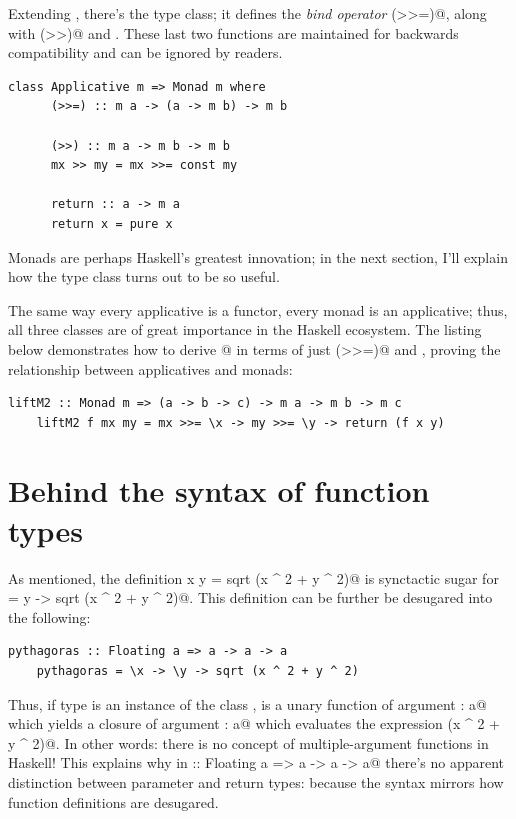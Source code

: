 \documentclass[UdineBachThesis,american,11pt,draft]{PhdThesis}
\begin{document}
  Extending \lstinline@Applicative@, there's the \lstinline@Monad@ type class;
  it defines the \emph{bind operator} \lstinline@(>>=)@, along with
  \lstinline@(>>)@ and \lstinline@return@. These last two functions are
  maintained for backwards compatibility and can be ignored by readers.

  \begin{lstlisting}[gobble=4,basicstyle=\ttfamily\small]
    class Applicative m => Monad m where
      (>>=) :: m a -> (a -> m b) -> m b

      (>>) :: m a -> m b -> m b
      mx >> my = mx >>= const my

      return :: a -> m a
      return x = pure x
  \end{lstlisting}

  Monads are perhaps Haskell's greatest innovation; in the next section, I'll
  explain how the \lstinline@Monad@ type class turns out to be so useful.

  The same way every applicative is a functor, every monad is an applicative;
  thus, all three classes are of great importance in the Haskell ecosystem. The
  listing below demonstrates how to derive @ in terms of just
  \lstinline@(>>=)@ and \lstinline@return@, proving the relationship between
  applicatives and monads:

  \begin{lstlisting}[gobble=4,basicstyle=\ttfamily\small]
    liftM2 :: Monad m => (a -> b -> c) -> m a -> m b -> m c
    liftM2 f mx my = mx >>= \x -> my >>= \y -> return (f x y)
  \end{lstlisting}

  \section{Behind the syntax of function types}

  As mentioned, the definition
  \lstinline@pythagoras x y = sqrt (x ^ 2 + y ^ 2)@ is synctactic sugar for
  \lstinline@pythagoras = \x y -> sqrt (x ^ 2 + y ^ 2)@. This definition can be
  further be desugared into the following:

  \begin{lstlisting}[gobble=4,basicstyle=\ttfamily\small]
    pythagoras :: Floating a => a -> a -> a
    pythagoras = \x -> \y -> sqrt (x ^ 2 + y ^ 2)
  \end{lstlisting}

  Thus, if type \lstinline@a@ is an instance of the class \lstinline@Floating@,
  \lstinline@pythagoras@ is a unary function of argument \lstinline@x : a@ which
  yields a closure of argument \lstinline@y : a@ which evaluates the expression
  \lstinline@sqrt (x ^ 2 + y ^ 2)@. In other words: there is no concept of
  multiple-argument functions in Haskell! This explains why in
  \lstinline@pythagoras :: Floating a => a -> a -> a@ there's no apparent
  distinction between parameter and return types: because the syntax mirrors how
  function definitions are desugared.
\end{document}
